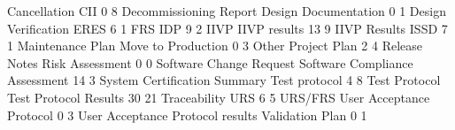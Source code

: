 \documentclass{article}
\begin{document}
\begin{Schunk}
\begin{Soutput}
                    Cancellation                              CII 
                               0                                8 
          Decommissioning Report             Design Documentation 
                               0                                1 
             Design Verification                             ERES 
                               6                                1 
                             FRS                              IDP 
                               9                                2 
                            IIVP                     IIVP results 
                              13                                9 
                    IIVP Results                             ISSD 
                               7                                1 
                Maintenance Plan               Move to Production 
                               0                                3 
                           Other                     Project Plan 
                               2                                4 
                   Release Notes                  Risk Assessment 
                               0                                0 
         Software Change Request   Software Compliance Assessment 
                              14                                3 
    System Certification Summary                    Test protocol 
                               4                                8 
                   Test Protocol            Test Protocol Results 
                              30                               21 
                    Traceability                              URS 
                               6                                5 
                         URS/FRS         User Acceptance Protocol 
                               0                                3 
User Acceptance Protocol results                  Validation Plan 
                               0                                1 
\end{Soutput}
\end{Schunk}
\end{document}
